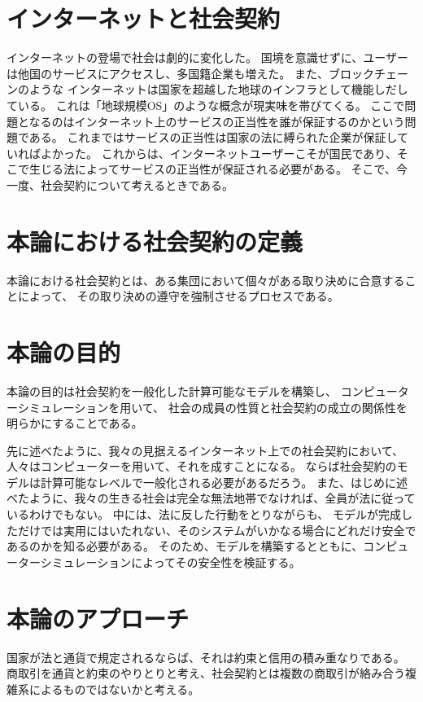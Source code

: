   \section{インターネットと社会契約} %
  インターネットの登場で社会は劇的に変化した。
  国境を意識せずに、ユーザーは他国のサービスにアクセスし、多国籍企業も増えた。
  また、ブロックチェーンのような
  インターネットは国家を超越した地球のインフラとして機能しだしている。
  これは「地球規模OS」のような概念が現実味を帯びてくる。
  ここで問題となるのはインターネット上のサービスの正当性を誰が保証するのかという問題である。
  これまではサービスの正当性は国家の法に縛られた企業が保証していればよかった。
  これからは、インターネットユーザーこそが国民であり、そこで生じる法によってサービスの正当性が保証される必要がある。
  そこで、今一度、社会契約について考えるときである。  


  \section{本論における社会契約の定義}
  本論における社会契約とは、ある集団において個々がある取り決めに合意することによって、
  その取り決めの遵守を強制させるプロセスである。


  \section{本論の目的}
  本論の目的は社会契約を一般化した計算可能なモデルを構築し、
  コンピューターシミュレーションを用いて、
  社会の成員の性質と社会契約の成立の関係性を明らかにすることである。

  先に述べたように、我々の見据えるインターネット上での社会契約において、
  人々はコンピューターを用いて、それを成すことになる。
  ならば社会契約のモデルは計算可能なレベルで一般化される必要があるだろう。
  また、はじめに述べたように、我々の生きる社会は完全な無法地帯でなければ、全員が法に従っているわけでもない。
  中には、法に反した行動をとりながらも、
  モデルが完成しただけでは実用にはいたれない、そのシステムがいかなる場合にどれだけ安全であるのかを知る必要がある。
  そのため、モデルを構築するとともに、コンピューターシミュレーションによってその安全性を検証する。

  \section{本論のアプローチ}
  国家が法と通貨で規定されるならば、それは約束と信用の積み重なりである。
  商取引を通貨と約束のやりとりと考え、社会契約とは複数の商取引が絡み合う複雑系によるものではないかと考える。


